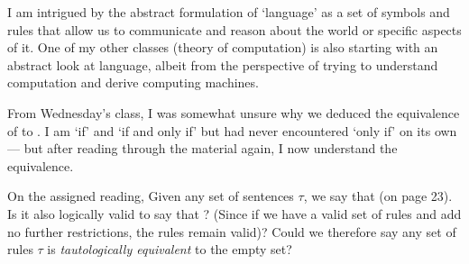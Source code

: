 \documentclass{memoir}
\begin{document}
\setlength{\headheight}{13.0pt}
\setlength{\footskip}{15.0pt}

\begin{vplace}[0.7]
  I am intrigued by the abstract formulation of `language'
  as a set of symbols and rules that allow us to communicate
  and reason about the world or specific aspects of it.
  One of my other classes (theory of computation) is also
  starting with an abstract look at language, albeit from
  the perspective of trying to understand computation
  and derive computing machines.
  
  From Wednesday's class,
  I was somewhat unsure why we deduced the equivalence
  of  to .
  I am `if' and `if and only if' but
  had never encountered `only if' on its own ---
  but after reading through the material again,
  I now understand the equivalence.

  On the assigned reading,
  Given any set of sentences $\tau$,
  we say that \crim{$\varnothing \models \tau$}
  (on page 23).
  Is it also logically valid to say that \crim{$\tau \models \varnothing$}?
  (Since if we have a valid set of rules
  and add no further restrictions,
  the rules remain valid)?
  Could we therefore say any set of rules $\tau$ is
  \emph{tautologically equivalent} to the empty set?
\end{vplace}
\bigskip
\end{document}
